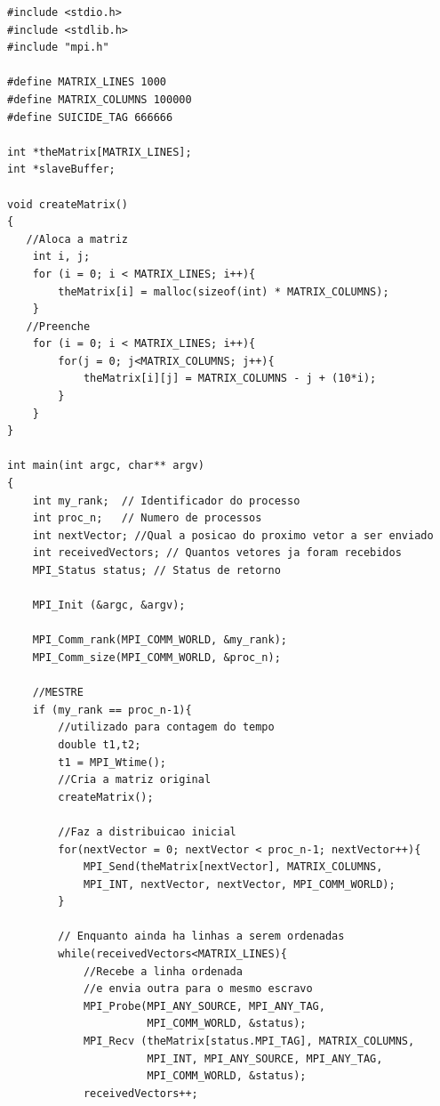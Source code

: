 \documentclass[12pt]{article}
\begin{document}
\begin{lstlisting}
#include <stdio.h>
#include <stdlib.h>
#include "mpi.h"

#define MATRIX_LINES 1000
#define MATRIX_COLUMNS 100000
#define SUICIDE_TAG 666666

int *theMatrix[MATRIX_LINES];
int *slaveBuffer;

void createMatrix()
{
   //Aloca a matriz
    int i, j;
    for (i = 0; i < MATRIX_LINES; i++){
        theMatrix[i] = malloc(sizeof(int) * MATRIX_COLUMNS);
    }
   //Preenche
    for (i = 0; i < MATRIX_LINES; i++){
        for(j = 0; j<MATRIX_COLUMNS; j++){
            theMatrix[i][j] = MATRIX_COLUMNS - j + (10*i);
        }
    }
}

int main(int argc, char** argv)
{
    int my_rank;  // Identificador do processo
    int proc_n;   // Numero de processos
    int nextVector; //Qual a posicao do proximo vetor a ser enviado
    int receivedVectors; // Quantos vetores ja foram recebidos 
    MPI_Status status; // Status de retorno

    MPI_Init (&argc, &argv);

    MPI_Comm_rank(MPI_COMM_WORLD, &my_rank);
    MPI_Comm_size(MPI_COMM_WORLD, &proc_n);
    
    //MESTRE
    if (my_rank == proc_n-1){
	    //utilizado para contagem do tempo
	    double t1,t2;
	    t1 = MPI_Wtime();
        //Cria a matriz original
        createMatrix();

        //Faz a distribuicao inicial
        for(nextVector = 0; nextVector < proc_n-1; nextVector++){
            MPI_Send(theMatrix[nextVector], MATRIX_COLUMNS,
            MPI_INT, nextVector, nextVector, MPI_COMM_WORLD);
        }

        // Enquanto ainda ha linhas a serem ordenadas
        while(receivedVectors<MATRIX_LINES){
            //Recebe a linha ordenada
            //e envia outra para o mesmo escravo
            MPI_Probe(MPI_ANY_SOURCE, MPI_ANY_TAG, 
                      MPI_COMM_WORLD, &status);
            MPI_Recv (theMatrix[status.MPI_TAG], MATRIX_COLUMNS,
                      MPI_INT, MPI_ANY_SOURCE, MPI_ANY_TAG,
                      MPI_COMM_WORLD, &status);
            receivedVectors++;


\end{lstlisting}
\end{document}

